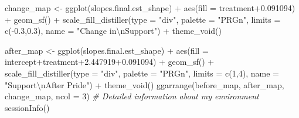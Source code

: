 \documentclass[
]{article}
\newenvironment{Shaded}{\begin{snugshade}}{\end{snugshade}}
\newcommand{\AttributeTok}[1]{\textcolor[rgb]{0.77,0.63,0.00}{#1}}
\newcommand{\CommentTok}[1]{\textcolor[rgb]{0.56,0.35,0.01}{\textit{#1}}}
\newcommand{\DecValTok}[1]{\textcolor[rgb]{0.00,0.00,0.81}{#1}}
\newcommand{\FloatTok}[1]{\textcolor[rgb]{0.00,0.00,0.81}{#1}}
\newcommand{\FunctionTok}[1]{\textcolor[rgb]{0.00,0.00,0.00}{#1}}
\newcommand{\NormalTok}[1]{#1}
\newcommand{\OtherTok}[1]{\textcolor[rgb]{0.56,0.35,0.01}{#1}}
\newcommand{\SpecialCharTok}[1]{\textcolor[rgb]{0.00,0.00,0.00}{#1}}
\newcommand{\StringTok}[1]{\textcolor[rgb]{0.31,0.60,0.02}{#1}}
\begin{document}
\begin{Shaded}
\begin{Highlighting}[]
\NormalTok{change\_map }\OtherTok{\textless{}{-}} \FunctionTok{ggplot}\NormalTok{(slopes.final.est\_shape) }\SpecialCharTok{+}
  \FunctionTok{aes}\NormalTok{(}\AttributeTok{fill =}\NormalTok{ treatment}\FloatTok{+0.091094}\NormalTok{) }\SpecialCharTok{+}
  \FunctionTok{geom\_sf}\NormalTok{() }\SpecialCharTok{+} 
  \FunctionTok{scale\_fill\_distiller}\NormalTok{(}\AttributeTok{type =} \StringTok{"div"}\NormalTok{, }\AttributeTok{palette =} \StringTok{"PRGn"}\NormalTok{, }\AttributeTok{limits =} \FunctionTok{c}\NormalTok{(}\SpecialCharTok{{-}}\FloatTok{0.3}\NormalTok{,}\FloatTok{0.3}\NormalTok{), }\AttributeTok{name =} \StringTok{"Change in}\SpecialCharTok{\textbackslash{}n}\StringTok{Support"}\NormalTok{) }\SpecialCharTok{+} 
  \FunctionTok{theme\_void}\NormalTok{()}

\NormalTok{after\_map }\OtherTok{\textless{}{-}} \FunctionTok{ggplot}\NormalTok{(slopes.final.est\_shape) }\SpecialCharTok{+}
  \FunctionTok{aes}\NormalTok{(}\AttributeTok{fill =}\NormalTok{ intercept}\SpecialCharTok{+}\NormalTok{treatment}\FloatTok{+2.447919+0.091094}\NormalTok{) }\SpecialCharTok{+}
  \FunctionTok{geom\_sf}\NormalTok{() }\SpecialCharTok{+} 
  \FunctionTok{scale\_fill\_distiller}\NormalTok{(}\AttributeTok{type =} \StringTok{"div"}\NormalTok{, }\AttributeTok{palette =} \StringTok{"PRGn"}\NormalTok{, }\AttributeTok{limits =} \FunctionTok{c}\NormalTok{(}\DecValTok{1}\NormalTok{,}\DecValTok{4}\NormalTok{), }\AttributeTok{name =} \StringTok{"Support}\SpecialCharTok{\textbackslash{}n}\StringTok{After Pride"}\NormalTok{) }\SpecialCharTok{+}
  \FunctionTok{theme\_void}\NormalTok{()}
\FunctionTok{ggarrange}\NormalTok{(before\_map, after\_map, change\_map, }\AttributeTok{ncol =} \DecValTok{3}\NormalTok{)}
\CommentTok{\# Detailed information about my environment}
\FunctionTok{sessionInfo}\NormalTok{()}
\end{Highlighting}
\end{Shaded}
\end{document}

